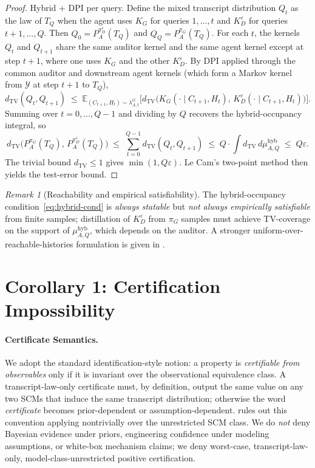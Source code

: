 \documentclass{article}
\theoremstyle{plain}
\theoremstyle{definition}
\theoremstyle{remark}
\newtheorem{remark}[theorem]{Remark}
\newcommand{\TV}{\mathrm{TV}}
\newcommand{\dtv}{d_{\TV}}
\newcommand{\Y}{\mathcal{Y}}
\newcommand{\PpiA}[1]{P_A^{\pi_{#1}}}
\begin{document}
\begin{proof}
Hybrid + DPI per query. Define the mixed transcript distribution $Q_t$ as
the law of $T_Q$ when the agent uses $K_G$ for queries $1, \ldots, t$ and
$K_D^\varepsilon$ for queries $t+1, \ldots, Q$. Then $Q_0 = P_A^{\pi_D^\varepsilon}(T_Q)$
and $Q_Q = P_A^{\pi_G}(T_Q)$. For each $t$, the kernels $Q_t$ and $Q_{t+1}$
share the same auditor kernel and the same agent kernel except at step $t+1$,
where one uses $K_G$ and the other $K_D^\varepsilon$. By DPI applied through
the common auditor and downstream agent kernels (which form a Markov kernel
from $\Y$ at step $t+1$ to $T_Q$),
\[
\dtv(Q_t, Q_{t+1}) \;\le\; \mathbb{E}_{(C_{t+1}, H_t) \sim \lambda_{A,t}^{G}}\!
\big[\dtv\!\big(K_G(\cdot \mid C_{t+1}, H_t),\, K_D^\varepsilon(\cdot \mid C_{t+1}, H_t)\big)\big].
\]
Summing over $t = 0, \ldots, Q-1$ and dividing by $Q$ recovers the
hybrid-occupancy integral, so
\[
\dtv\!\big(\PpiA{G}(T_Q),\, P_A^{\pi_D^\varepsilon}(T_Q)\big)
\;\le\; \sum_{t=0}^{Q-1} \dtv(Q_t, Q_{t+1})
\;\le\; Q \cdot \int \dtv \, d\mu_{A,Q}^{\mathrm{hyb}}
\;\le\; Q\varepsilon.
\]
The trivial bound $\dtv \le 1$ gives $\min(1, Q\varepsilon)$. Le Cam's
two-point method then yields the test-error bound.
\end{proof}

\begin{remark}[Reachability and empirical satisfiability]
The hybrid-occupancy condition~\eqref{eq:hybrid-cond} is \emph{always statable}
but \emph{not always empirically satisfiable} from finite samples; distillation
of $K_D^\varepsilon$ from $\pi_G$ samples must achieve TV-coverage on the
support of $\mu_{A, Q}^{\mathrm{hyb}}$, which depends on the auditor. A
stronger uniform-over-reachable-histories formulation is given in
.
\end{remark}

\section{Corollary 1: Certification Impossibility}\label{sec:cor-1}

\paragraph{Certificate Semantics.}
We adopt the standard identification-style notion: a property is
\emph{certifiable from observables} only if it is invariant over the
observational equivalence class. A transcript-law-only certificate must,
by definition, output the same value on any two SCMs that induce the same
transcript distribution; otherwise the word \emph{certificate} becomes
prior-dependent or assumption-dependent.  rules
out this convention applying nontrivially over the unrestricted SCM class.
We do \emph{not} deny Bayesian evidence under priors, engineering confidence
under modeling assumptions, or white-box mechanism claims; we deny worst-case,
transcript-law-only, model-class-unrestricted positive certification.
\end{document}

